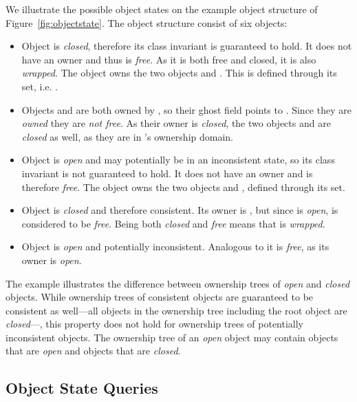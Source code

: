 We illustrate the possible object states on the example object structure of Figure~\ref{fig:objectstate}. The object structure consist of six objects:

\begin{itemize}
\item Object  is \emph{closed}, therefore its class invariant is guaranteed to hold. It does not have an owner and thus is \emph{free}. As it is both free and closed, it is also \emph{wrapped}. The object  owns the two objects  and . This is defined through its  set, i.e. .

\item Objects  and  are both owned by , so their  ghost field points to . Since they are \emph{owned} they are \emph{not free}. As their owner  is \emph{closed}, the two objects  and  are \emph{closed} as well, as they are in 's ownership domain.

\item Object  is \emph{open} and may potentially be in an inconsistent state, so its class invariant is not guaranteed to hold. It does not have an owner and is therefore \emph{free}. The object  owns the two objects  and , defined through its  set.

\item Object  is \emph{closed} and therefore consistent. Its owner is , but since  is \emph{open},  is considered to be \emph{free}. Being both \emph{closed} and \emph{free} means that  is \emph{wrapped}.

\item Object  is \emph{open} and potentially inconsistent. Analogous to  it is \emph{free}, as its owner  is \emph{open}.
\end{itemize}

The example illustrates the difference between ownership trees of \emph{open} and \emph{closed} objects. While ownership trees of consistent objects are guaranteed to be consistent as well---all objects in the ownership tree including the root object are \emph{closed}---, this property does not hold for ownership trees of potentially inconsistent objects. The ownership tree of an \emph{open} object may contain objects that are \emph{open} and objects that are \emph{closed}.


\subsection{Object State Queries}

